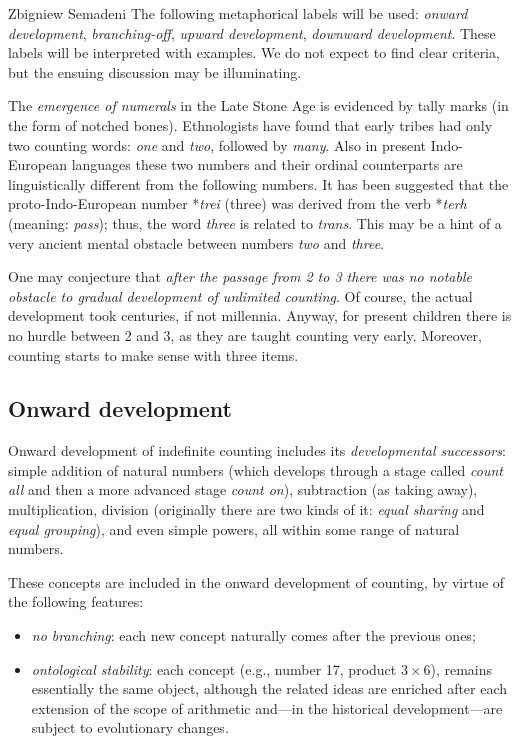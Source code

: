 \begin{artengenv}{Zbigniew Semadeni}
\noindent The following metaphorical labels will be used: \textit{onward development}, 
\textit{branching-off},    %
\textit{upward development}, \textit{downward development}. These labels will be
interpreted with examples. We do not expect to find clear criteria, but the ensuing discussion 
may be illuminating. 

The \textit{emergence of numerals} in the Late Stone Age is evidenced by tally 
marks (in the form of notched bones). Ethnologists have found that early tribes 
had only two counting words: \textit{one} and \textit{two}, followed by \textit{many}. 
Also in present Indo-European languages these two numbers and their ordinal 
counterparts are linguistically different from the following numbers. 
It has been suggested that the proto-Indo-European number *\textit{trei} (three) was 
derived from the verb *\textit{terh} (meaning: \textit{pass}); thus, the word 
\textit{three} is related to \textit{trans}. This may be a hint of a very ancient 
mental obstacle between numbers \textit{two} and \textit{three}. 

One may conjecture that \textit{after the passage from 2 to 3 there was no notable 
obstacle to gradual development of unlimited counting}. Of course, the actual 
development took centuries, if not millennia. Anyway, for present children 
there is no hurdle between 2 and 3, as they are taught counting very early. 
Moreover, counting starts to make sense with three items. 

\subsection{Onward development}
Onward development of indefinite counting includes its \textit{developmental 
successors}: simple addition of natural numbers (which develops through a stage 
called \textit{count all} and then a more advanced stage \textit{count on}), 
subtraction (as taking away), multiplication, division (originally there are two 
kinds of it: \textit{equal sharing} and \textit{equal grouping}), and even simple 
powers, all within some range of natural numbers.  

These concepts are included in the onward development of counting, by virtue of 
the following features: 

\begin{itemize}
\item \textit{no branching}: each new concept naturally comes after the previous ones; 
\item \textit{ontological stability}: each concept (e.g., number 17, product 
\mbox{$3\times 6$}), remains essentially the same object, although the related 
ideas are enriched after each extension of the scope of arithmetic and---in the 
historical development---are subject to evolutionary changes.
\end{itemize}


\end{artengenv}
